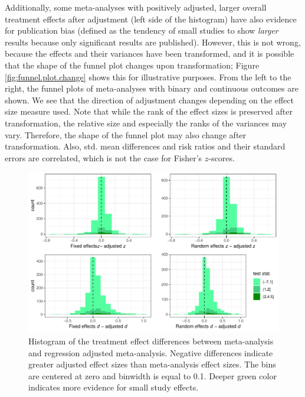 \documentclass[11pt,a4paper,twoside]{book}\usepackage[]{graphicx}\usepackage[]{color}
\newenvironment{knitrout}{}{} %
\begin{document}
Additionally, some meta-analyses with positively adjusted, larger overall treatment effects after adjustment (left side of the histogram) have also evidence for publication bias (defined as the tendency of small studies to show \textit{larger} results because only significant results are published). However, this is not wrong, because the effects and their variances have been transformed, and it is possible that the shape of the funnel plot changes upon transformation; Figure \ref{fig:funnel.plot.change} shows this for illustrative purposes. From the left to the right, the funnel plots of meta-analyses with binary and continuous outcomes are shown. We see that the direction of adjustment changes depending on the effect size measure used. Note that while the rank of the effect sizes is preserved after transformation, the relative size and especially the ranks of the variances may vary. Therefore, the shape of the funnel plot may also change after transformation. Also, std. mean differences and risk ratios and their standard errors are correlated, which is not the case for Fisher's $z$-scores. 

\begin{figure}
\begin{knitrout}
\color{fgcolor}

{\centering \includegraphics[width=\textwidth-3cm]{figure/ch03_figunnamed-chunk-19-1} 

}



\end{knitrout}
\caption{Histogram of the treatment effect differences between meta-analysis and regression adjusted meta-analysis. Negative differences indicate greater adjusted effect sizes than meta-analysis effect sizes. The bins are centered at zero and binwidth is equal to 0.1. Deeper green color indicates more evidence for small study effects.}
\label{fig:adjustment.reg}
\end{figure}
\end{document}
